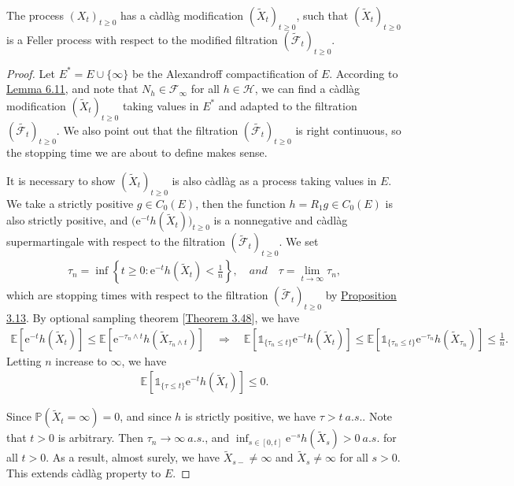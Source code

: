 \documentclass{article}
\numberwithin{equation}{section}
\newcommand{\e}{\mathrm{e}}
\newcommand{\E}{\mathbb{E}}
\renewcommand{\P}{\mathbb{P}}
\theoremstyle{plain}
\theoremstyle{definition}
\begin{document}
The process $(X_t)_{t\geq 0}$ has a càdlàg modification $(\widetilde{X}_t)_{t\geq 0}$, such that $(\widetilde{X}_t)_{t\geq 0}$ is a Feller process with respect to the modified filtration $(\widetilde{\mathscr{F}}_t)_{t\geq 0}$.
\begin{proof}
Let $E^*=E\cup\{\infty\}$ be the Alexandroff compactification of $E$. According to \hyperref[lemma:6.11]{Lemma 6.11}, and note that $N_h\in\mathscr{F}_\infty$ for all $h\in\mathscr{H}$, we can find a càdlàg modification $(\widetilde{X}_t)_{t\geq 0}$ taking values in $E^*$ and adapted to the filtration $(\widetilde{\mathscr{F}_t})_{t\geq 0}$. We also point out that the filtration $(\widetilde{\mathscr{F}_t})_{t\geq 0}$ is right continuous, so the stopping time we are about to define makes sense.

It is necessary to show $(\widetilde{X}_t)_{t\geq 0}$ is also càdlàg as a process taking values in $E$. We take a strictly positive $g\in C_0(E)$, then the function $h=R_1g\in C_0(E)$ is also strictly positive, and $\bigl(\e^{-t}h(\widetilde{X}_t)\bigr)_{t\geq 0}$ is a nonnegative and càdlàg supermartingale with respect to the filtration $(\widetilde{\mathscr{F}}_t)_{t\geq 0}$. We set
\begin{align*}
	\tau_n=\inf\left\{t\geq 0:\e^{-t}h(\widetilde{X}_t)<\frac{1}{n}\right\},\quad and\quad \tau=\lim_{t\to\infty}\tau_n,
\end{align*}
which are stopping times with respect to the filtration $(\widetilde{\mathscr{F}}_t)_{t\geq 0}$ by \hyperref[prop:3.13]{Proposition 3.13}. By optional sampling theorem [\hyperref[thm:3.48]{Theorem 3.48}], we have
\begin{align*}
	\E\left[\e^{-t}h(\widetilde{X}_t)\right]\leq\E\left[\e^{-\tau_n\wedge t}h(\widetilde{X}_{\tau_n\wedge t})\right] \quad\Rightarrow\quad \E\left[\mathds{1}_{\{\tau_n\leq t\}}\e^{-t}h(\widetilde{X}_t)\right]\leq \E\left[\mathds{1}_{\{\tau_n\leq t\}}\e^{-\tau_n}h(\widetilde{X}_{\tau_n})\right]\leq\frac{1}{n}.
\end{align*}
Letting $n$ increase to $\infty$, we have
\begin{align*}
	\E\left[\mathds{1}_{\{\tau\leq t\}}\e^{-t}h(\widetilde{X}_t)\right]\leq 0.
\end{align*}

Since $\P(\widetilde{X}_t=\infty)=0$, and since $h$ is strictly positive, we have $\tau>t\ a.s.$. Note that $t>0$ is arbitrary. Then $\tau_n\to\infty\ a.s.$, and $\inf_{s\in[0,t]}\e^{-s}h(\widetilde{X}_s)>0\ a.s.$ for all $t>0$. As a result, almost surely, we have $\widetilde{X}_{s-}\neq\infty$ and $\widetilde{X}_s\neq\infty$ for all $s>0$. This extends càdlàg property to $E$.


\end{proof}
\end{document}
